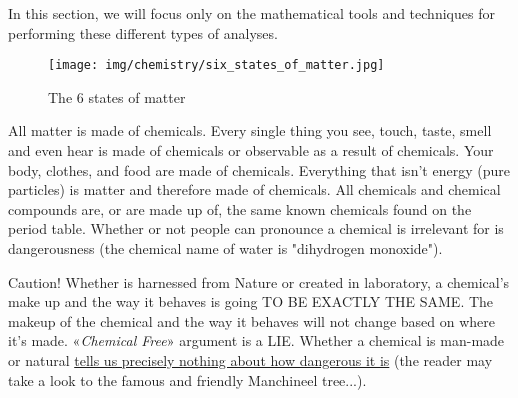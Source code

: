 	In this section, we will focus only on the mathematical tools and techniques for performing these different types of analyses.
	
	\begin{figure}[H]
		\centering
		\texttt{[image: img/chemistry/six\_states\_of\_matter.jpg]}	
		\caption{The 6 states of matter}
	\end{figure}
	
	\begin{tcolorbox}[title=Remark,colframe=black,arc=10pt]
	All matter is made of chemicals. Every single thing you see, touch, taste, smell and even hear is made of chemicals or observable as a result of chemicals. Your body, clothes, and food are made of chemicals. Everything that isn't energy (pure particles) is matter and therefore made of chemicals. All chemicals and chemical compounds are, or are made up of, the same known chemicals found on the period table. Whether or not people can pronounce a chemical is irrelevant for is dangerousness (the chemical name of water is "dihydrogen monoxide"). 
	\end{tcolorbox}
	
	\begin{tcolorbox}[colback=red!5,borderline={1mm}{2mm}{red!5},arc=0mm,boxrule=0pt]
	\bcbombe Caution! Whether is harnessed from Nature or created in laboratory, a chemical's make up and the way it behaves is going TO BE EXACTLY THE SAME. The makeup of the chemical and the way it behaves will not change based on where it's made. «\textit{Chemical Free}» argument is a LIE. Whether a chemical is man-made or natural \underline{tells us precisely nothing about how dangerous it is} (the reader may take a look to the famous and friendly Manchineel tree...).
	\end{tcolorbox}

